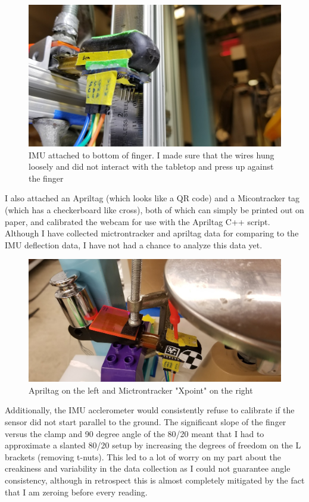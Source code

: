 \documentclass[preprint,12pt,3p]{elsarticle}
\begin{document}
\begin{figure}[H]
\centering
\includegraphics[width=.5\textwidth]{images/setup/IMU.jpg}
\caption{IMU attached to bottom of finger. I made sure that the wires hung
loosely and did not interact with the tabletop and  press up against the finger}
\end{figure}

I also attached an Apriltag (which looks like a QR code) and a Micontracker tag (which has a
checkerboard like cross), both of which can simply be printed out on paper, and calibrated the
webcam for use with the Apriltag C++ script. Although I have collected mictrontracker and apriltag
data for comparing to the IMU deflection data, I have not had a chance to
analyze this data yet.

\begin{figure}[H]
\centering
\includegraphics[width=.6\textwidth]{images/setup/microntracker_template.jpg}
\caption{Apriltag on the left and Mictrontracker "Xpoint" on the right}
\end{figure}

Additionally, the IMU acclerometer would consistently refuse to calibrate if the sensor did not
start parallel to the ground. The significant slope of the finger versus the clamp and 90 degree
angle of the 80/20 meant that I had to approximate a slanted 80/20 setup by increasing the degrees
of freedom on the L brackets (removing t-nuts). This led to a lot of worry on my part about the
creakiness and variability in the data collection as I could not guarantee angle consistency,
although in retrospect this is almost completely mitigated by the fact that I am zeroing before
every reading. 
\end{document}
